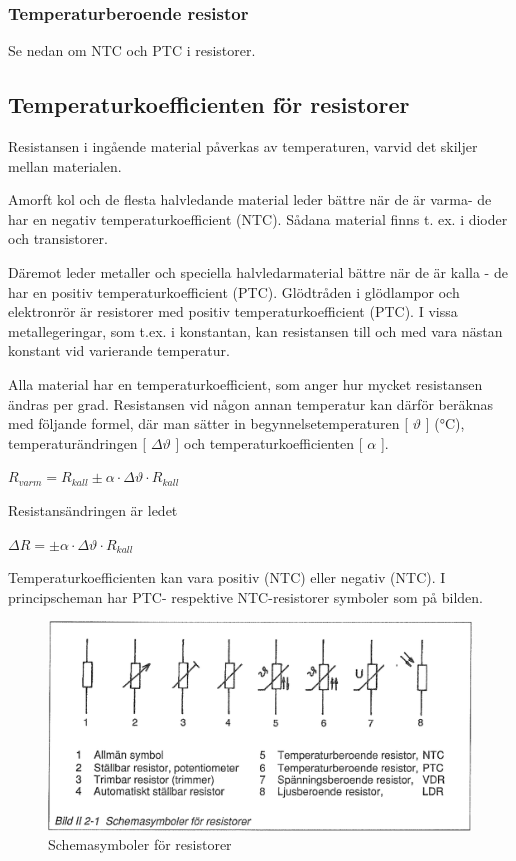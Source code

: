 \subsubsection{Temperaturberoende resistor}

Se nedan om NTC och PTC i resistorer.

\subsection{Temperaturkoefficienten för resistorer}

Resistansen i ingående material påverkas av temperaturen, varvid det skiljer
mellan materialen.

Amorft kol och de flesta halvledande material leder bättre när de är varma- de
har en negativ temperaturkoefficient (NTC). Sådana material finns t. ex. i
dioder och transistorer.

Däremot leder metaller och speciella halvledarmaterial bättre när de är kalla -
de har en positiv temperaturkoefficient (PTC). Glödtråden i glödlampor och
elektronrör är resistorer med positiv temperaturkoefficient (PTC). I vissa
metallegeringar, som t.ex. i konstantan, kan resistansen till och med vara
nästan konstant vid varierande temperatur.

Alla material har en temperaturkoefficient, som anger hur mycket resistansen
ändras per grad. Resistansen vid någon annan temperatur kan därför beräknas med
följande formel, där man sätter in begynnelsetemperaturen [ \(\vartheta\) ]
(°C), temperaturändringen [ \(\Delta \vartheta\) ] och
temperaturkoefficienten [ \(\alpha\) ].

\(R_{varm} = R_{kall} \pm \alpha \cdot \Delta \vartheta \cdot R_{kall}\)

Resistansändringen är ledet

\( \Delta R = \pm \alpha \cdot \Delta \vartheta \cdot R_{kall}\)

Temperaturkoefficienten kan vara positiv (NTC) eller negativ (NTC).
I principscheman har PTC- respektive NTC-resistorer symboler som på bilden.

\begin{figure}
\includegraphics[width=\textwidth]{images/bild_2_2-01}
\caption{Schemasymboler för resistorer}
\label{fig:BildII2-1}
\end{figure}


